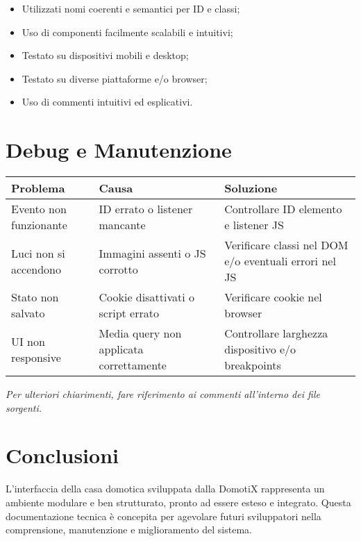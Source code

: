 \documentclass[a4paper,12pt]{article}
\begin{document}
\begin{itemize}
  \item Utilizzati nomi coerenti e semantici per ID e classi;
  \item Uso di componenti facilmente scalabili e intuitivi;
  \item Testato su dispositivi mobili e desktop;
  \item Testato su diverse piattaforme e/o browser;
  \item Uso di commenti intuitivi ed esplicativi.
\end{itemize}

\section{Debug e Manutenzione}

\begin{tabular}{|p{5cm}|p{5cm}|p{5cm}|}
\hline
\textbf{Problema} & \textbf{Causa} & \textbf{Soluzione} \\
\hline
Evento non funzionante & ID errato o listener mancante & Controllare ID elemento e listener JS \\
\hline
Luci non si accendono & Immagini assenti o JS corrotto & Verificare classi nel DOM e/o eventuali errori nel JS \\
\hline
Stato non salvato & Cookie disattivati o script errato & Verificare cookie nel browser \\
\hline
UI non responsive & Media query non applicata correttamente & Controllare larghezza dispositivo e/o breakpoints \\
\hline
\end{tabular}

\vspace{0.8cm}
\textit{Per ulteriori chiarimenti, fare riferimento ai commenti all'interno dei file sorgenti.}

\section{Conclusioni}

L'interfaccia della casa domotica sviluppata dalla DomotiX rappresenta un ambiente modulare e ben strutturato, pronto ad essere esteso e integrato. Questa documentazione tecnica è concepita per agevolare futuri sviluppatori nella comprensione, manutenzione e miglioramento del sistema.
\end{document}
